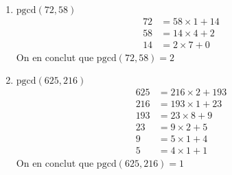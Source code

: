 \begin{exemple}~ 
\begin{enumerate}
\item $\mathrm{pgcd}(72, 58)$
\begin{align*}
72 &= 58 \times 1 + 14 \\
58 &= 14 \times 4 + 2 \\
14 &= 2 \times 7 + 0
\end{align*}
On en conclut que $\mathrm{pgcd}(72, 58) = 2$

\item $\mathrm{pgcd}(625, 216)$
\begin{align*}
625 &= 216 \times 2 + 193 \\
216 &= 193 \times 1 + 23 \\
193 &= 23 \times 8 + 9 \\
23 &= 9 \times 2 + 5 \\
9 &= 5 \times 1 + 4 \\
5 &= 4 \times 1 + 1
\end{align*}
On en conclut que $\mathrm{pgcd}(625, 216) = 1$
\end{enumerate}
\end{exemple}